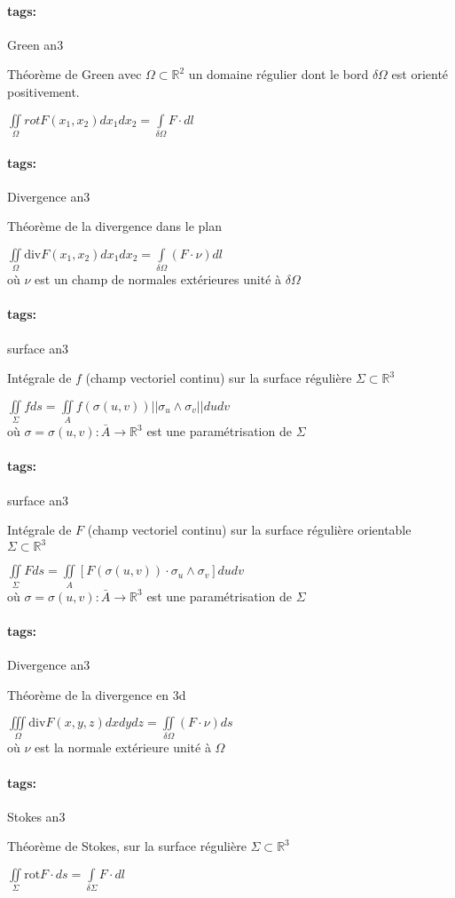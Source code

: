 \documentclass[12pt]{article}
\newcommand*{\xfield}[1]{\begin{mdframed}\centering #1\end{mdframed}\bigskip}
\newenvironment{note}{}{}
\newcommand*{\tags}[1]{\paragraph{tags: }#1}
\begin{document}
\begin{note}
	\tags{Green an3}
	\xfield{Théorème de Green avec $\Omega \subset \mathbb{R}^2$ un domaine
    régulier dont le bord $\delta \Omega$ est orienté positivement.}
	\xfield{$\iint\limits_{\Omega} rot F (x_1,x_2) dx_1dx_2 =
    \int\limits_{\delta \Omega} F \cdot dl$}
\end{note}

\begin{note}
	\tags{Divergence an3}
	\xfield{Théorème de la divergence dans le plan}
	\xfield{$\iint\limits_{\Omega} \text{div} F(x_1,x_2) dx_1dx_2 =
    \int\limits_{\delta \Omega} (F \cdot \nu) dl$\\
où $\nu$ est un champ de normales extérieures unité à $\delta \Omega$}
\end{note}

\begin{note}
	\tags{surface an3}
	\xfield{Intégrale de $f$ (champ vectoriel continu) sur la surface régulière $\Sigma \subset \mathbb{R}^3$}
	\xfield{$\iint\limits_{\Sigma} f ds = \iint\limits_A f(\sigma (u,v)) ||
    \sigma_u \wedge \sigma_v|| du dv$\\
où $\sigma = \sigma(u,v): \bar{A} \to \mathbb{R}^3$ est une paramétrisation de $\Sigma$}
\end{note}

\begin{note}
	\tags{surface an3}
	\xfield{Intégrale de $F$ (champ vectoriel continu) sur la surface régulière orientable $\Sigma \subset \mathbb{R}^3$}
	\xfield{$\iint\limits_{\Sigma} F ds = \iint\limits_A \left[ F(\sigma (u,v)) \cdot 
    \sigma_u \wedge \sigma_v \right] du dv$\\
où $\sigma = \sigma(u,v): \bar{A} \to \mathbb{R}^3$ est une paramétrisation de $\Sigma$}
\end{note}

\begin{note}
	\tags{Divergence an3}
	\xfield{Théorème de la divergence en 3d}
	\xfield{$\iiint\limits_{\Omega} \text{div} F(x,y,z) dxdydz =
    \iint\limits_{\delta \Omega} (F\cdot \nu) ds$\\
où $\nu$ est la normale extérieure unité à $\Omega$}
\end{note}

\begin{note}
	\tags{Stokes an3}
	\xfield{Théorème de Stokes, sur la surface régulière $\Sigma \subset \mathbb{R}^3$}
	\xfield{$\iint\limits_{\Sigma} \text{rot} F \cdot ds =
    \int\limits_{\delta \Sigma} F\cdot dl$}
\end{note}
\end{document}
